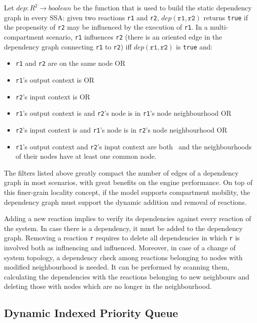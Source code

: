 \documentclass[12pt,a4paper,twoside,openright]{book}
\begin{document}
Let $dep: R^2 \longrightarrow boolean$ be the function that is used to build the static dependency graph in every SSA: given two reactions \texttt{r1} and \texttt{r2}, $dep(\texttt{r1}, \texttt{r2})$ returns \texttt{true} if the propensity of \texttt{r2} may be influenced by the execution of \texttt{r1}.
%
In a multi-compartment scenario, \texttt{r1} influences \texttt{r2} (there is an oriented edge in the dependency graph connecting \texttt{r1} to \texttt{r2}) iff $dep(\texttt{r1},\texttt{r2})$ is \texttt{true} and:
\begin{itemize}
 \item \texttt{r1} and \texttt{r2} are on the same node OR
 \item \texttt{r1}'s output context is \globalc{} OR
 \item \texttt{r2}'s input context is \globalc{} OR
 \item \texttt{r1}'s output context is \neighborhood{} and \texttt{r2}'s node is in \texttt{r1}'s node neighbourhood OR
 \item \texttt{r2}'s input context is \neighborhood{} and \texttt{r1}'s node is in \texttt{r2}'s node neighbourhood OR
 \item \texttt{r1}'s output context and \texttt{r2}'s input context are both \neighborhood\ and the neighbourhoods of their nodes have at least one common node. 
\end{itemize}
%
The filters listed above greatly compact the number of edges of a dependency graph in most scenarios, with great benefits on the engine performance.
%
On top of this finer-grain locality concept, if the model supports compartment mobility, the dependency graph must support the dynamic addition and removal of reactions.

Adding a new reaction implies to verify its dependencies against every reaction of the system. In case there is a dependency, it must be added to the dependency graph. 
Removing a reaction \texttt{r} requires to delete all dependencies in which \texttt{r} is involved both as influencing and influenced.
Moreover, in case of a change of system topology, a dependency check among reactions belonging to nodes with modified neighbourhood is needed. It can be performed by scanning them, calculating the dependencies with the reactions belonging to new neighbours and deleting those with nodes which are no longer in the neighbourhood.

\subsection{Dynamic Indexed Priority Queue}
\end{document}
